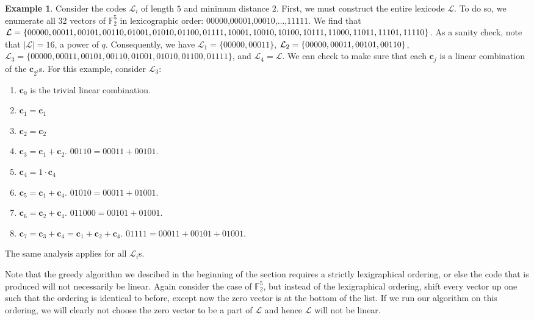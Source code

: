 \documentclass{article}
\theoremstyle{plain}
\theoremstyle{definition}
\newtheorem{exmp}[theorem]{Example}
\begin{document}
\begin{exmp}
Consider the codes $\mathcal{L}_i$ of length $5$ and minimum distance $2$.  First, we must construct the entire lexicode $\mathcal{L}$.  To do so, we enumerate
all 32 vectors of $\mathbb{F}_2^5$ in lexicographic order: $00000$,$00001$,$00010$,$\ldots$,$11111$.  We find that $\mathcal{L} = \{00000, 00011,00101,00110,01001,
01010,01100,01111,10001,10010,\\ 10100,10111,11000,11011,11101,11110\}$.  As a sanity check, note that $\left | \mathcal{L} \right | = 16$, a power of $q$.  Consequently, we have
$\mathcal{L}_1 = \{00000,00011\}$, $\mathcal{L}_2 = \{00000, 00011,00101,\\ 00110\}$, $\mathcal{L}_3 = \{00000, 00011,00101,00110,01001,01010,01100,01111\}$, and
$\mathcal{L}_4 = \mathcal{L}$. We can check to make sure that each $\mathbf{c}_j$ is a linear combination of the $\mathbf{c}_{2^i}$s. For this example, consider $\mathcal{L}_3$:

\begin{enumerate}%
\item $\mathbf{c}_0$ is the trivial linear combination.
\item $\mathbf{c}_1 = \mathbf{c}_1$
\item $\mathbf{c}_2 = \mathbf{c}_2$
\item $\mathbf{c}_3 = \mathbf{c}_1 + \mathbf{c}_2$.  $00110 = 00011+ 00101$.
\item $\mathbf{c}_4 = 1\cdot\mathbf{c}_4$
\item $\mathbf{c}_5 = \mathbf{c}_1 + \mathbf{c}_4$. $01010 = 00011 + 01001$.
\item $\mathbf{c}_6 = \mathbf{c}_2 + \mathbf{c}_4$. $011000 = 00101 + 01001$.
\item $\mathbf{c}_7 = \mathbf{c}_3 + \mathbf{c}_4 = \mathbf{c}_1 + \mathbf{c}_2 + \mathbf{c}_4$. $01111 = 00011 + 00101+01001$.
\end{enumerate}

The same analysis applies for all $\mathcal{L}_i$s.

\end{exmp}

Note that the greedy algorithm we descibed in the beginning of the section requires a strictly lexigraphical ordering, or else the code that is produced will not necessarily
be linear.  Again consider the case of $\mathbb{F}_2^5$, but instead of the lexigraphical ordering, shift every vector up one such that the ordering is identical to before, except now the
zero vector is at the bottom of the list.  If we run our algorithm on this ordering, we will clearly not choose the zero vector to be a part of $\mathcal{L}$ and hence 
$\mathcal{L}$ will not be linear.  
\end{document}
